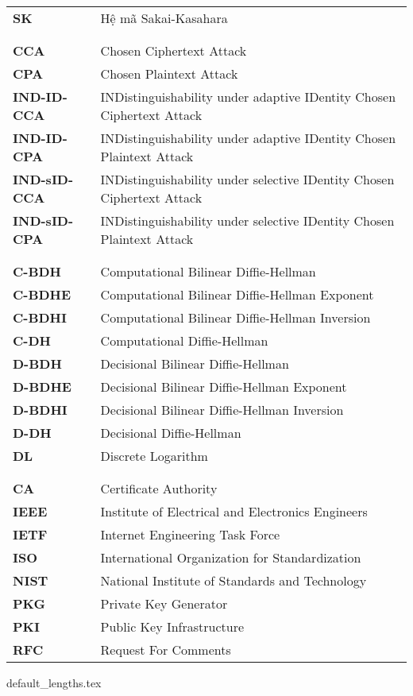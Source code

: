 \documentclass[class=report, crop=false]{standalone}
\begin{document}
\begin{longtabu}{>{\large\bfseries}p{3.2cm} >{\large}X[l]}
		SK 						& 	Hệ mã Sakai-Kasahara \cite{DBLP:journals/iacr/SakaiK03} 							\\
		\\  \\
		CCA						& 	Chosen Ciphertext Attack	\\
		CPA						& 	Chosen Plaintext Attack	\\
		IND-ID-CCA				& 	INDistinguishability under adaptive IDentity Chosen Ciphertext Attack				\\
		IND-ID-CPA				& 	INDistinguishability under adaptive IDentity Chosen Plaintext Attack				\\
		IND-sID-CCA				& 	INDistinguishability under selective IDentity Chosen Ciphertext Attack				\\
		IND-sID-CPA				& 	INDistinguishability under selective IDentity Chosen Plaintext Attack				\\
		\\  \\
		C-BDH					& 	Computational Bilinear Diffie-Hellman 												\\
		C-BDHE					& 	Computational Bilinear Diffie-Hellman Exponent 										\\
		C-BDHI					& 	Computational Bilinear Diffie-Hellman Inversion 									\\
		C-DH					& 	Computational Diffie-Hellman 														\\
		D-BDH					& 	Decisional Bilinear Diffie-Hellman 													\\
		D-BDHE					& 	Decisional Bilinear Diffie-Hellman Exponent											\\
		D-BDHI					& 	Decisional Bilinear Diffie-Hellman Inversion 										\\
		D-DH					& 	Decisional Diffie-Hellman 															\\
		DL						& 	Discrete Logarithm 																	\\
		\\  \\
		CA						&	Certificate Authority																\\
		IEEE					&	Institute of Electrical and Electronics Engineers									\\
		IETF					&	Internet Engineering Task Force														\\
		ISO						&	International Organization for Standardization 										\\
		NIST					&	National Institute of Standards and Technology 										\\
		PKG						&	Private Key Generator																\\
		PKI						&	Public Key Infrastructure															\\
		RFC						&	Request For Comments																\\
	\end{longtabu}
	\newpage
	{default_lengths.tex}
\end{document}
